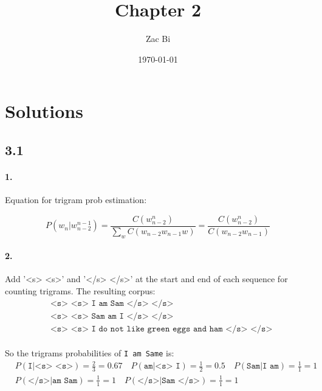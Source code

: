 \documentclass{article}
\begin{document}
\begin{titlepage}
    \title{Chapter 2}
    \author{Zac Bi}
    \date{\today}
    \maketitle
    \pagestyle{empty}
\end{titlepage}


\section*{Solutions}

\subsection*{3.1}

\paragraph{1.}
Equation for trigram prob estimation:

$$P(w_n|w_{n-2}^{n-1}) =  \displaystyle\frac{C(w_{n-2}^{n})}{\sum_{w} C(w_{n-2} w_{n-1} w)} = \displaystyle\frac{C(w_{n-2}^{n})}{C(w_{n-2} w_{n-1})}$$

\paragraph{2.}
Add '<s> <s>' and '</s> </s>' at the start and end  of each sequence for counting trigrams.
The resulting corpus:
\begin{align*}
     & \texttt{<s> <s> I am Sam </s> </s>}                         \\
     & \texttt{<s> <s> Sam am I </s> </s>}                         \\
     & \texttt{<s> <s> I do not like green eggs and ham </s> </s>}
\end{align*}

\paragraph{}
So the trigrams probabilities of \texttt{I am Same} is:
\begin{align*}
     & P(\texttt{I|<s> <s>}) = \frac{2}{3} = 0.67 \quad
    P(\texttt{am|<s> I}) = \frac{1}{2} = 0.5 \quad
    P(\texttt{Sam|I am}) = \frac{1}{1} = 1              \\
     & P(\texttt{</s>|am Sam}) = \frac{1}{1} = 1 \quad
    P(\texttt{</s>|Sam </s>}) = \frac{1}{1} = 1 \quad
\end{align*}
\end{document}
